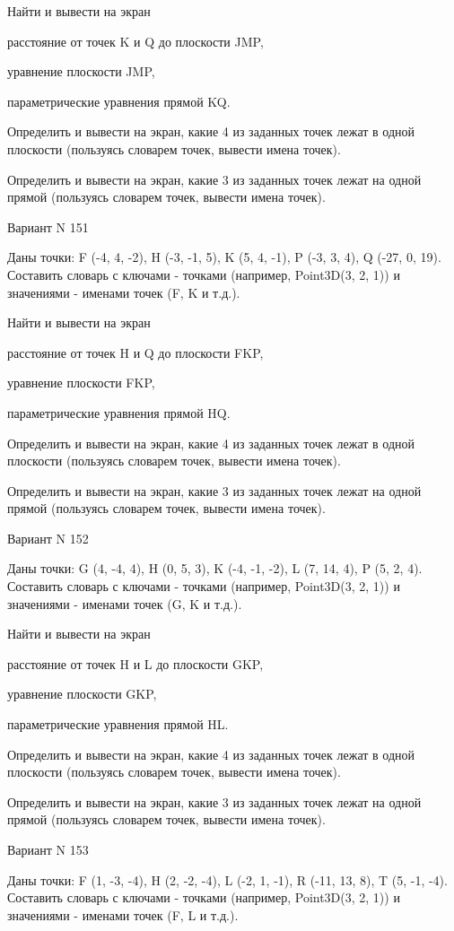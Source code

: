 \documentclass[11pt]{report}
\begin{document}
Найти и вывести на экран


расстояние от точек K и Q до плоскости JMP,


уравнение плоскости JMP,


параметрические уравнения прямой KQ.


Определить и вывести на экран, какие 4 из заданных точек лежат в одной плоскости (пользуясь словарем точек, вывести имена точек).


Определить и вывести на экран, какие 3 из заданных точек лежат на одной прямой (пользуясь словарем точек, вывести имена точек).

\newpage
Вариант N 151

Даны точки: F (-4, 4, -2), H (-3, -1, 5), K (5, 4, -1), P (-3, 3, 4), Q (-27, 0, 19).
Составить словарь с ключами - точками (например, Point3D(3, 2, 1)) и значениями - именами точек (F, K и т.д.).


Найти и вывести на экран


расстояние от точек H и Q до плоскости FKP,


уравнение плоскости FKP,


параметрические уравнения прямой HQ.


Определить и вывести на экран, какие 4 из заданных точек лежат в одной плоскости (пользуясь словарем точек, вывести имена точек).


Определить и вывести на экран, какие 3 из заданных точек лежат на одной прямой (пользуясь словарем точек, вывести имена точек).

\newpage
Вариант N 152

Даны точки: G (4, -4, 4), H (0, 5, 3), K (-4, -1, -2), L (7, 14, 4), P (5, 2, 4).
Составить словарь с ключами - точками (например, Point3D(3, 2, 1)) и значениями - именами точек (G, K и т.д.).


Найти и вывести на экран


расстояние от точек H и L до плоскости GKP,


уравнение плоскости GKP,


параметрические уравнения прямой HL.


Определить и вывести на экран, какие 4 из заданных точек лежат в одной плоскости (пользуясь словарем точек, вывести имена точек).


Определить и вывести на экран, какие 3 из заданных точек лежат на одной прямой (пользуясь словарем точек, вывести имена точек).

\newpage
Вариант N 153

Даны точки: F (1, -3, -4), H (2, -2, -4), L (-2, 1, -1), R (-11, 13, 8), T (5, -1, -4).
Составить словарь с ключами - точками (например, Point3D(3, 2, 1)) и значениями - именами точек (F, L и т.д.).
\end{document}
